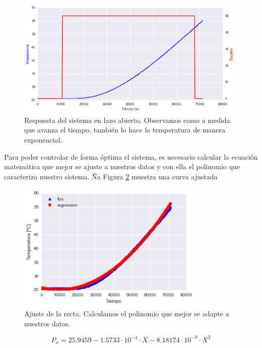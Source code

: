 \begin{figure}[H]
    \centering
    \includegraphics[width=0.99\textwidth]{images/PLC/modelado/modelado_9_1.png}
    \caption[Respuesta del sistema en lazo abierto]{Respuesta del sistema en lazo abierto. Observamos como a medida que avanza el tiempo, también lo hace la temperatura de manera exponencial.}
    \label{fig:plc_lazo_abierto}
\end{figure}

Para poder controlar de forma óptima el sistema, es necesario calcular la ecuación matemática que mejor se ajuste a nuestros datos y con ella el polinomio que caracteriza nuestro sistema. Ña Figura \ref{fig:plc_lazo_abierto2} muestra una curva ajustada

\begin{figure}[H]
    \centering
    \includegraphics[width=0.8\textwidth]{images/PLC/modelado/modelado_13_1.png}
    \caption[Ajuste de la recta.]{Ajuste de la recta. Calculamos el polinomio que mejor se adapte a nuestros datos.}
    \label{fig:plc_lazo_abierto2}
\end{figure}

\begin{equation}
P_x=  25.9459 -1.5733 \cdot 10^{-4} \cdot X - 8.18174 \cdot 10^{-9} \cdot X^2
\end{equation}

